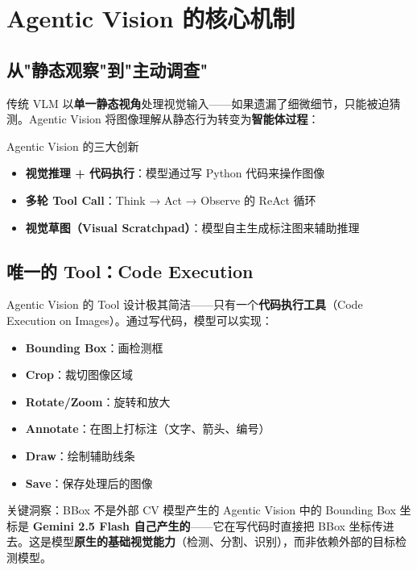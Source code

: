 \section{Agentic Vision 的核心机制}

\subsection{从"静态观察"到"主动调查"}

传统 VLM 以\textbf{单一静态视角}处理视觉输入——如果遗漏了细微细节，只能被迫猜测。Agentic Vision 将图像理解从静态行为转变为\textbf{智能体过程}：

\begin{importantbox}{Agentic Vision 的三大创新}
\begin{itemize}
    \item \textbf{视觉推理 + 代码执行}：模型通过写 Python 代码来操作图像
    \item \textbf{多轮 Tool Call}：Think → Act → Observe 的 ReAct 循环
    \item \textbf{视觉草图（Visual Scratchpad）}：模型自主生成标注图来辅助推理
\end{itemize}
\end{importantbox}

\subsection{唯一的 Tool：Code Execution}

Agentic Vision 的 Tool 设计极其简洁——只有一个\textbf{代码执行工具}（Code Execution on Images）。通过写代码，模型可以实现：

\begin{itemize}
    \item \textbf{Bounding Box}：画检测框
    \item \textbf{Crop}：裁切图像区域
    \item \textbf{Rotate/Zoom}：旋转和放大
    \item \textbf{Annotate}：在图上打标注（文字、箭头、编号）
    \item \textbf{Draw}：绘制辅助线条
    \item \textbf{Save}：保存处理后的图像
\end{itemize}

\begin{warningbox}{关键洞察：BBox 不是外部 CV 模型产生的}
Agentic Vision 中的 Bounding Box 坐标是 \textbf{Gemini 2.5 Flash 自己产生的}——它在写代码时直接把 BBox 坐标传进去。这是模型\textbf{原生的基础视觉能力}（检测、分割、识别），而非依赖外部的目标检测模型。
\end{warningbox}

